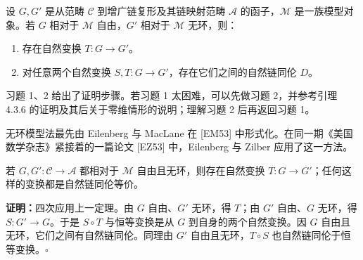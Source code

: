 设 $G,G'$ 是从范畴 $\mathcal C$ 到增广链复形及其链映射范畴 $\mathcal A$ 的函子，$\mathcal M$ 是一族模型对象。若 $G$ 相对于 $\mathcal M$ 自由，$G'$ 相对于 $\mathcal M$ 无环，则：
\begin{enumerate}[label=(\alph*)]
\item 存在自然变换 $T:G\to G'$。
\item 对任意两个自然变换 $S,T:G\to G'$，存在它们之间的自然链同伦 $D$。
\end{enumerate}
习题 1、2 给出了证明步骤。若习题 1 太困难，可以先做习题 2，并参考引理 4.3.6 的证明及其后关于零维情形的说明；理解习题 2 后再返回习题 1。

无环模型法最先由 Eilenberg 与 MacLane 在 [EM53] 中形式化。在同一期《美国数学杂志》紧接着的一篇论文 [EZ53] 中，Eilenberg 与 Zilber 应用了这一方法。

若 $G,G':\mathcal C\to\mathcal A$ 都相对于 $\mathcal M$ 自由且无环，则存在自然变换 $T:G\to G'$；任何这样的变换都是自然链同伦等价。

\textbf{证明：}四次应用上一定理。由 $G$ 自由、$G'$ 无环，得 $T$；由 $G'$ 自由、$G$ 无环，得 $S:G'\to G$。于是 $S\circ T$ 与恒等变换是从 $G$ 到自身的两个自然变换。因 $G$ 自由且无环，它们之间有自然链同伦。同理由 $G'$ 自由且无环，$T\circ S$ 也自然链同伦于恒等变换。\hfill$\square$

